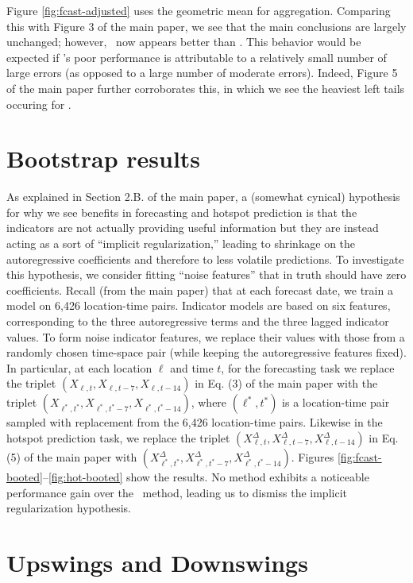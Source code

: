Figure \ref{fig:fcast-adjusted} uses the geometric
mean for aggregation.  Comparing this with Figure 3 of the main paper,
we see that the main conclusions are largely unchanged; however,
\chngcli~now appears better than \ar.  This behavior would be
expected if \chngcli's poor performance is attributable to a
relatively small number of large errors (as opposed to a large number
of moderate errors).  Indeed, Figure 5 of the main paper further
corroborates this, in which we see the heaviest left tails occuring
for \chngcli.

\section{Bootstrap results}

As explained in Section 2.B. of the main paper, a (somewhat cynical)
hypothesis for why we see benefits in forecasting and hotspot
prediction is that the indicators are not actually providing useful
information but they are instead acting as a sort of ``implicit
regularization,''  leading to shrinkage on the autoregressive
coefficients and therefore to less volatile predictions.  To investigate
this hypothesis, we consider fitting  ``noise features'' that in truth
should have zero coefficients.  Recall (from the main paper) that at each
forecast date, we 
train a model on 6,426 location-time pairs.  Indicator models are
based on six features, corresponding to the three autoregressive terms
and the three lagged indicator values.  To form noise indicator features,
we replace their values with those from a randomly chosen time-space pair
(while keeping the autoregressive 
features fixed).  In particular, at each location $\ell$ and
time $t$, for the forecasting task we replace the triplet $(X_{\ell,t}, X_{\ell,t-7},
X_{\ell,t-14})$ in Eq. (3) of the main paper with the triplet $(X_{\ell^*,t^*},
X_{\ell^*,t^*-7}, 
X_{\ell^*,t^*-14})$, where $(\ell^*,t^*)$ is a location-time pair
sampled with replacement from the 6,426 location-time pairs.  
Likewise in the hotspot prediction task, we replace the triplet
$(X_{\ell,t}^\Delta, X_{\ell,t-7}^\Delta, 
X_{\ell,t-14}^\Delta)$ in Eq. (5) of the main paper with
$(X_{\ell^*,t^*}^\Delta, X_{\ell^*,t^*-7}^\Delta, 
X_{\ell^*,t^*-14}^\Delta)$.
Figures
\ref{fig:fcast-booted}--\ref{fig:hot-booted} show the results.  No
method exhibits a noticeable performance gain over the \ar~method,
leading us to dismiss the implicit regularization hypothesis.



\section{Upswings and Downswings}

